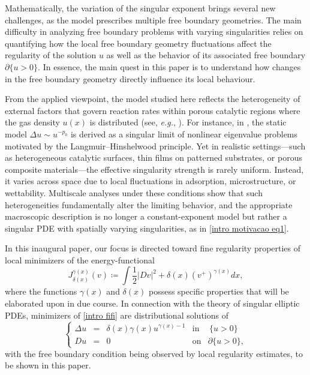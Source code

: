 \documentclass[reqno,11pt]{amsart}
\newcommand{\1}{\mathds{1}}
\numberwithin{equation}{section}
\begin{document}
Mathematically, the variation of the singular exponent brings several new challenges, as the model prescribes multiple free boundary geometries. The main difficulty in analyzing free boundary problems with varying singularities relies on quantifying how the local free boundary geometry fluctuations affect the regularity of the solution $u$ as well as the behavior of its associated free boundary $\partial \{u>0\}$. In essence, the main quest in this paper is to understand how changes in the free boundary geometry directly influence its local behaviour.  

From the applied viewpoint, the model studied here reflects the heterogeneity of external factors that govern reaction rates within porous catalytic regions where the gas density $u(x)$ is distributed (see, \textit{e.g.}, \cite{Aris}). For instance, in \cite{BN}, the static model $\Delta u \sim u^{-p_0}$ is derived as a singular limit of nonlinear eigenvalue problems motivated by the Langmuir–Hinshelwood principle. Yet in realistic settings—such as heterogeneous catalytic surfaces, thin films on patterned substrates, or porous composite materials—the effective singularity strength is rarely uniform. Instead, it varies across space due to local fluctuations in adsorption, microstructure, or wettability. Multiscale analyses under these conditions show that such heterogeneities fundamentally alter the limiting behavior, and the appropriate macroscopic description is no longer a constant-exponent model but rather a singular PDE with spatially varying singularities, as in \eqref{intro motivacao eq1}.

In this inaugural paper, our focus is directed toward fine regularity properties of local minimizers of the energy-functional
\begin{equation}\label{intro fifi}
    J_{\delta(x)}^{\gamma(x)}(v) \coloneqq  \int \frac{1}{2} \left| Dv \right|^2 + \delta(x) (v^+)^{\gamma(x)} dx,
\end{equation}
where the functions $\gamma(x)$ and $\delta(x)$ possess specific properties that will be elaborated upon in due course. In connection with the theory of singular elliptic PDEs, minimizers of \eqref{intro fifi} are distributional solutions of 
$$\left\{
    \begin{array}{rllcl}
        \Delta u & = & \delta(x) \gamma (x) u^{\gamma(x)-1} & \mathrm{in} & \,\{u>0\}\\
     Du & = & 0 & \mathrm{on} & \partial \{u>0\},
    \end{array}
\right.
$$
with the free boundary condition being observed by local regularity estimates, to be shown in this paper. 
\end{document}
